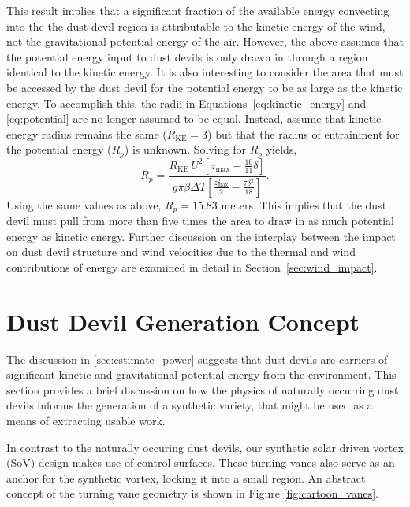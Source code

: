 This result implies that a significant fraction of the available energy 
convecting into the the dust devil region is attributable to 
the kinetic energy of the wind, not the
gravitational potential energy of the air.
However, the above assumes that the potential energy input to dust 
devils is only drawn in through a region identical to the kinetic energy. 
It is also interesting to 
consider the area that must be accessed by the dust devil for the 
potential energy to be as large as the kinetic energy. To accomplish this,
the radii in Equations~\ref{eq:kinetic_energy} 
and \ref{eq:potential} are no longer 
assumed to be equal. Instead, assume that 
kinetic energy radius remains the same ($R_{\text{KE}} = 3$) but that 
the radius of entrainment for the potential energy ($R_{p}$) is unknown.
Solving for $R_p$ yields, 
\begin{equation}
  R_p = \frac{R_{\text{KE}} \, U^2 \left[ z_{\text{max}} - \frac{10}{11}\delta
\right]}{g  \pi \beta \Delta T \left[ \frac{z_\text{max}^2}{2} - \frac{7 \delta^2}{18} \right]}.
\end{equation}
Using the same values as above, $R_p = 15.83$ meters. 
This implies that the dust devil must pull from more than five times the area to
draw in as much potential energy as kinetic energy. 
Further discussion on the interplay
between the impact on dust devil structure and wind velocities due to
the thermal and wind contributions of energy are examined in detail in
Section~\ref{sec:wind_impact}. 


\section{Dust Devil Generation Concept}
\label{sec:dust_devil_concept}

The discussion in \ref{sec:estimate_power} suggests that dust devils are
carriers of significant kinetic and gravitational
potential energy from the environment. This section provides a brief
discussion on how the physics of naturally occurring dust devils informs
the generation of a synthetic variety, that might be used as a means of
extracting usable work.    

In contrast to the naturally occuring dust devils,
our synthetic solar driven vortex (SoV) design makes use of
control surfaces. These turning vanes also serve as an anchor for the
synthetic vortex, locking it into a small region. An abstract concept of
the turning vane geometry is shown in Figure \ref{fig:cartoon_vanes}.


